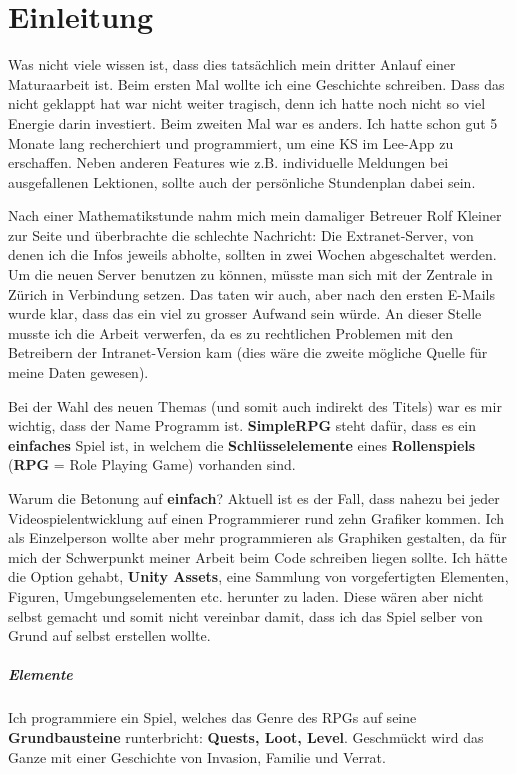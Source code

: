 \chapter{Einleitung}

Was nicht viele wissen ist, dass dies tatsächlich mein dritter Anlauf einer Maturaarbeit ist.
Beim ersten Mal wollte ich eine Geschichte schreiben.
Dass das nicht geklappt hat war nicht weiter tragisch, denn ich hatte noch nicht so viel Energie darin investiert.
Beim zweiten Mal war es anders.
Ich hatte schon gut 5 Monate lang recherchiert und programmiert, um eine KS im Lee-App zu erschaffen.
Neben anderen Features wie z.B. individuelle Meldungen bei ausgefallenen Lektionen, sollte auch der persönliche Stundenplan dabei sein. 

\smallskip
Nach einer Mathematikstunde nahm mich mein damaliger Betreuer Rolf Kleiner zur Seite und überbrachte die schlechte Nachricht: Die Extranet-Server, von denen ich die Infos jeweils abholte, sollten in zwei Wochen abgeschaltet werden. Um die neuen Server benutzen zu können, müsste man sich mit der Zentrale in Zürich in Verbindung setzen. Das taten wir auch, aber nach den ersten E-Mails wurde klar, dass das ein viel zu grosser Aufwand sein würde. An dieser Stelle musste ich die Arbeit verwerfen, da es zu rechtlichen Problemen mit den Betreibern der Intranet-Version kam (dies wäre die zweite mögliche Quelle für meine Daten gewesen).

\smallskip
Bei der Wahl des neuen Themas (und somit auch indirekt des Titels) war es mir wichtig, dass der Name Programm ist.
\textbf{SimpleRPG} steht dafür, dass es ein \textbf{einfaches} Spiel ist, in welchem die \textbf{Schlüsselelemente} eines \textbf{Rollenspiels} (\textbf{RPG} = Role Playing Game) vorhanden sind.

\smallskip
Warum die Betonung auf \textbf{einfach}? Aktuell ist es der Fall, dass nahezu bei jeder Videospielentwicklung auf einen Programmierer rund zehn Grafiker kommen.
Ich als Einzelperson wollte aber mehr programmieren als Graphiken gestalten, da für mich der Schwerpunkt meiner Arbeit beim Code schreiben liegen sollte.
Ich hätte die Option gehabt, \textbf{Unity Assets}, eine Sammlung von vorgefertigten Elementen, Figuren, Umgebungselementen etc. herunter zu laden.
Diese wären aber nicht selbst gemacht und somit nicht vereinbar damit, dass ich das Spiel selber von Grund auf selbst erstellen wollte.
\paragraph{Elemente}
Ich programmiere ein Spiel, welches das Genre des RPGs auf seine \textbf{Grundbausteine} runterbricht: \textbf{Quests, Loot, Level}. Geschmückt wird das Ganze mit einer Geschichte von Invasion, Familie und Verrat.



